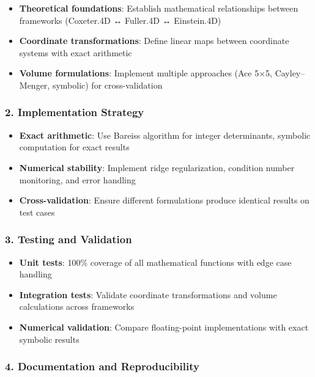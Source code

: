 \documentclass[
  10pt,
]{article}
\providecommand{\tightlist}{%
  \setlength{\itemsep}{0pt}\setlength{\parskip}{0pt}}
\begin{document}
\begin{itemize}
\tightlist
\item
  \textbf{Theoretical foundations}: Establish mathematical relationships
  between frameworks (Coxeter.4D ↔ Fuller.4D ↔ Einstein.4D)
\item
  \textbf{Coordinate transformations}: Define linear maps between
  coordinate systems with exact arithmetic
\item
  \textbf{Volume formulations}: Implement multiple approaches (Ace 5×5,
  Cayley--Menger, symbolic) for cross-validation
\end{itemize}

\hypertarget{implementation-strategy-1}{%
\subsubsection{2. Implementation
Strategy}\label{implementation-strategy-1}}

\begin{itemize}
\tightlist
\item
  \textbf{Exact arithmetic}: Use Bareiss algorithm for integer
  determinants, symbolic computation for exact results
\item
  \textbf{Numerical stability}: Implement ridge regularization,
  condition number monitoring, and error handling
\item
  \textbf{Cross-validation}: Ensure different formulations produce
  identical results on test cases
\end{itemize}

\hypertarget{testing-and-validation}{%
\subsubsection{3. Testing and Validation}\label{testing-and-validation}}

\begin{itemize}
\tightlist
\item
  \textbf{Unit tests}: 100\% coverage of all mathematical functions with
  edge case handling
\item
  \textbf{Integration tests}: Validate coordinate transformations and
  volume calculations across frameworks
\item
  \textbf{Numerical validation}: Compare floating-point implementations
  with exact symbolic results
\end{itemize}

\hypertarget{documentation-and-reproducibility}{%
\subsubsection{4. Documentation and
Reproducibility}\label{documentation-and-reproducibility}}
\end{document}
